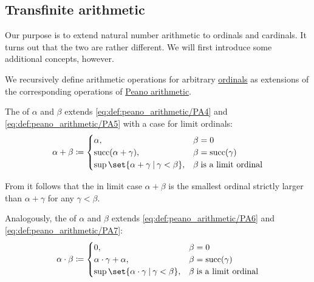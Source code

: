 \subsection{Transfinite arithmetic}\label{subsec:transfinite_arithmetic}

Our purpose is to extend natural number arithmetic to ordinals and cardinals. It turns out that the two are rather different. We will first introduce some additional concepts, however.

\begin{definition}\label{def:ordinal_arithmetic}
  We recursively define arithmetic operations for arbitrary \hyperref[def:ordinal]{ordinals} as extensions of the corresponding operations of \hyperref[def:peano_arithmetic]{Peano arithmetic}.

  \begin{thmenum}
     The  of \( \alpha \) and \( \beta \) extends \eqref{eq:def:peano_arithmetic/PA4} and \eqref{eq:def:peano_arithmetic/PA5} with a case for limit ordinals:
    \begin{equation}\label{eq:def:ordinal_arithmetic/addition}
      \alpha + \beta \coloneqq \begin{cases}
        \alpha,                                            &\beta = 0 \\
        \op{succ}(\alpha + \gamma),                        &\beta = \op{succ}(\gamma) \\
        \sup\set{ \alpha + \gamma \given \gamma < \beta }, &\beta \T{is a limit ordinal} \\
      \end{cases}
    \end{equation}

    From  it follows that the in limit case \( \alpha + \beta \) is the smallest ordinal strictly larger than \( \alpha + \gamma \) for any \( \gamma < \beta \).

     Analogously, the  of \( \alpha \) and \( \beta \) extends \eqref{eq:def:peano_arithmetic/PA6} and \eqref{eq:def:peano_arithmetic/PA7}:
    \begin{equation}\label{eq:def:ordinal_arithmetic/multiplication}
      \alpha \cdot \beta \coloneqq \begin{cases}
        0,                                                     &\beta = 0 \\
        \alpha \cdot \gamma + \alpha,                          &\beta = \op{succ}(\gamma) \\
        \sup\set{ \alpha \cdot \gamma \given \gamma < \beta }, &\beta \T{is a limit ordinal} \\
      \end{cases}
    \end{equation}


\end{thmenum}
\end{definition}

